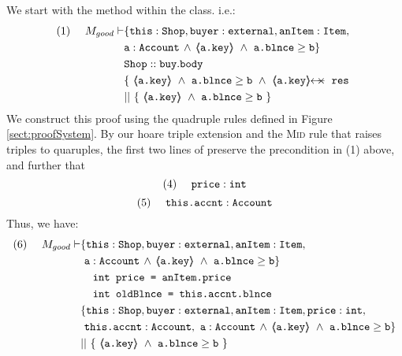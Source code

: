 \begin{proofO}
We start with the  method within the  class. i.e.:
\small
\begin{align*}
\text{(1)}  \ \ \ \ M_{good} \vdash 
		&	\{  \prg{this}:\prg{Shop}, \prg{buyer} : \prg{external}, 
		\prg{anItem} : \prg{Item},\\
		& \prg{a}:\prg{Account}\, \wedge\, {\inside{\prg{a.key}}}\ \wedge\ {\prg{a.blnce} \geq \prg{b}}\} \\
		& \prg{Shop}::\prg{buy}.\prg{body}\ \\ 
		& \{\ {\inside{\prg{a.key}}\ \wedge\ {\prg{a.blnce} \geq \prg{b}}}\ 
		\wedge\ {\protectedFrom{\prg{a.key}}{\prg{res}}}\ \\
		& ||\ \{\ {\inside{\prg{a.key}}\ \wedge\ 
							 {\prg{a.blnce} \geq \prg{b}}}\ \}
\end{align*}
\normalsize
We construct this proof using the quadruple rules defined in Figure \ref{sect:proofSystem}. By our hoare triple extension and the \textsc{Mid} rule that raises triples to quaruples, the first two lines
of \prg{buy} preserve the precondition in (1) above, and further that 
\small
$$
\text{(4)} \ \ \ \ \mbox{\normalfont{\texttt{price}}} : \mbox{\normalfont{\texttt{int}}}
$$ 
$$
\text{(5)} \ \ \ \ \prg{this.accnt} : \prg{Account}
$$ 
\normalsize
Thus, we have:
\small
\begin{align*}
\text{(6)}  \ \ \ \ M_{good} \vdash 
		&	\{  \prg{this}:\prg{Shop}, \prg{buyer} : \prg{external}, 
		\prg{anItem} : \prg{Item},\\
		&\  \prg{a}:\prg{Account}\, \wedge\, {\inside{\prg{a.key}}}\ \wedge\ {\prg{a.blnce} \geq \prg{b}}\} \\
		&\; \; \; \; \prg{int price = anItem.price} \\ 
		&\; \; \; \; \prg{int oldBlnce = this.accnt.blnce} \\
		&\{  \prg{this}:\prg{Shop}, \prg{buyer} : \prg{external}, 
		\prg{anItem} : \prg{Item}, \prg{price} : \prg{int}, \\
		& \ \prg{this.accnt} : \prg{Account},\  \prg{a}:\prg{Account}\, \wedge\, {\inside{\prg{a.key}}}\ \wedge\ {\prg{a.blnce} \geq \prg{b}}\} \\
		& ||\ \{\ {\inside{\prg{a.key}}\ \wedge\ 
							 {\prg{a.blnce} \geq \prg{b}}}\ \}
\end{align*}
\normalsize



\end{proofO}
